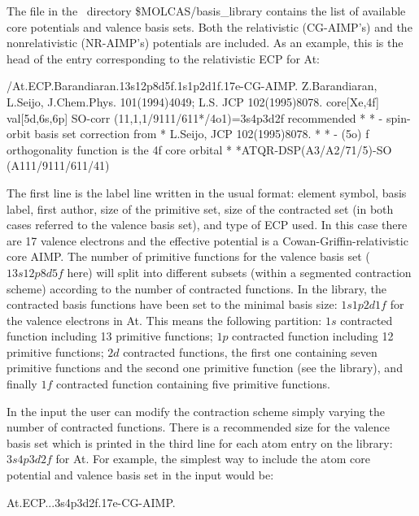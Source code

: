 
The file  in the \molcas\ directory {\$MOLCAS/basis\_library} contains the 
list of available core potentials and valence basis sets. Both the relativistic 
(CG-AIMP's) and the nonrelativistic (NR-AIMP's) potentials are included. As an 
example, this is the head of the entry corresponding to the relativistic ECP 
for At:

\begin{sourcelisting}
/At.ECP.Barandiaran.13s12p8d5f.1s1p2d1f.17e-CG-AIMP.
Z.Barandiaran, L.Seijo, J.Chem.Phys. 101(1994)4049; L.S. JCP 102(1995)8078.
core[Xe,4f] val[5d,6s,6p]  SO-corr  (11,1,1/9111/611*/4o1)=3s4p3d2f recommended
*
* - spin-orbit basis set correction from
*   L.Seijo, JCP 102(1995)8078.
*
* - (5o) f orthogonality function is the 4f core orbital
*
*ATQR-DSP(A3/A2/71/5)-SO       (A111/9111/611/41)
\end{sourcelisting}

The first line is the label line written in the usual  format:
element symbol, basis label, first author, size of the primitive set, size
of the contracted set (in both cases referred to the valence basis set), and
type of ECP used. In this case there are 17 valence electrons and the
effective potential is a Cowan-Griffin-relativistic core AIMP. The number of
primitive functions for the valence basis set ($13s12p8d5f$ here) will split 
into different subsets (within a segmented contraction scheme) according to 
the number of contracted functions. In the library, the contracted
basis functions have been set to the minimal basis size: $1s1p2d1f$ for the 
valence electrons in At. This means the following partition: $1s$ contracted
function including 13 primitive functions; $1p$ contracted function including
12 primitive functions; $2d$ contracted functions, the first one containing
seven primitive functions and the second one primitive function
(see the library), and finally $1f$ contracted function containing five 
primitive functions.

In the  input the user can modify the contraction scheme 
simply varying the number of contracted functions. There is a recommended size 
for the valence basis set which is printed in the third line for each atom entry
on the library: $3s4p3d2f$ for At. For example, the simplest way to include the
atom core potential and valence basis set in the  input would 
be:

\begin{inputlisting}
At.ECP...3s4p3d2f.17e-CG-AIMP. 
\end{inputlisting}

